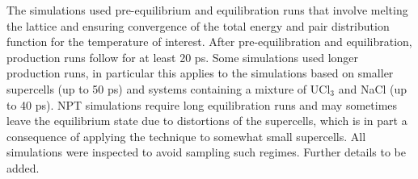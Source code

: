 \documentclass[preprint,3p,10pt,twocolumn,number,sort&compress]{elsarticle}
\begin{document}
The simulations used pre-equilibrium and equilibration runs that involve melting the lattice and ensuring convergence of the total energy and pair distribution function for the temperature of interest. After pre-equilibration and equilibration, production runs follow for at least 20 ps. Some simulations used longer production runs, in particular this applies to the simulations based on smaller supercells (up to 50 ps) and systems containing a mixture of UCl$_3$ and NaCl (up to 40 ps). NPT simulations require long equilibration runs and may sometimes leave the equilibrium state due to distortions of the supercells, which is in part a consequence of applying the technique to somewhat small supercells. All simulations were inspected to avoid sampling such regimes. {\color{red}Further details to be added}.   %
\end{document}
